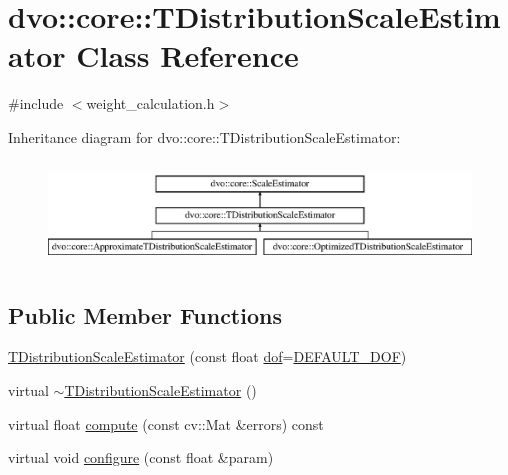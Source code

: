 \hypertarget{classdvo_1_1core_1_1_t_distribution_scale_estimator}{}\section{dvo\+:\+:core\+:\+:T\+Distribution\+Scale\+Estimator Class Reference}
\label{classdvo_1_1core_1_1_t_distribution_scale_estimator}


{\ttfamily \#include $<$weight\+\_\+calculation.\+h$>$}

Inheritance diagram for dvo\+:\+:core\+:\+:T\+Distribution\+Scale\+Estimator\+:\begin{figure}[H]
\begin{center}
\leavevmode
\includegraphics[height=2.781457cm]{classdvo_1_1core_1_1_t_distribution_scale_estimator}
\end{center}
\end{figure}
\subsection*{Public Member Functions}
\begin{DoxyCompactItemize}
\item 
\mbox{\hyperlink{classdvo_1_1core_1_1_t_distribution_scale_estimator_a1b50430701a4f6c103dedf40102e6506}{T\+Distribution\+Scale\+Estimator}} (const float \mbox{\hyperlink{classdvo_1_1core_1_1_t_distribution_scale_estimator_a4c5ece510a3315bad7ca711a27466eb9}{dof}}=\mbox{\hyperlink{classdvo_1_1core_1_1_t_distribution_scale_estimator_a031ff291023c516c23bce04b34b79957}{D\+E\+F\+A\+U\+L\+T\+\_\+\+D\+OF}})
\item 
virtual \mbox{\hyperlink{classdvo_1_1core_1_1_t_distribution_scale_estimator_ae96b7b80f30e797a21f59f60cce22a3c}{$\sim$\+T\+Distribution\+Scale\+Estimator}} ()
\item 
virtual float \mbox{\hyperlink{classdvo_1_1core_1_1_t_distribution_scale_estimator_a0ed88ffeb9b71110e3ae69b681526bc4}{compute}} (const cv\+::\+Mat \&errors) const
\item 
virtual void \mbox{\hyperlink{classdvo_1_1core_1_1_t_distribution_scale_estimator_a34ec79e7811c148606817510a00aa585}{configure}} (const float \&param)
\end{DoxyCompactItemize}
